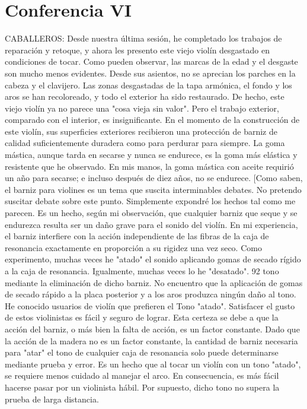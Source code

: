 \chapter*{Conferencia VI}
CABALLEROS: Desde nuestra última sesión, he completado los trabajos de reparación y retoque, y ahora les presento este viejo violín desgastado en condiciones de tocar. Como pueden observar, las marcas de la edad y el desgaste son mucho menos evidentes. Desde sus asientos, no se aprecian los parches en la cabeza y el clavijero. Las zonas desgastadas de la tapa armónica, el fondo y los aros se han recoloreado, y todo el exterior ha sido restaurado. De hecho, este viejo violín ya no parece una "cosa vieja sin valor". Pero el trabajo exterior, comparado con el interior, es insignificante. En el momento de la construcción de este violín, sus superficies exteriores recibieron una protección de barniz de calidad suficientemente duradera como para perdurar para siempre. La goma mástica, aunque tarda en secarse y nunca se endurece, es la goma más elástica y resistente que he observado. En mis manos, la goma mástica con aceite requirió un año para secarse; e incluso después de diez años, no se endurece. [Como saben, el barniz para violines es un tema que suscita interminables debates. No pretendo suscitar debate sobre este punto. Simplemente expondré los hechos tal como me parecen. Es un hecho, según mi observación, que cualquier barniz que seque y se endurezca resulta ser un daño grave para el sonido del violín. En mi experiencia, el barniz interfiere con la acción independiente de las fibras de la caja de resonancia exactamente en proporción a su rigidez una vez seco. Como experimento, muchas veces he "atado" el sonido aplicando gomas de secado rígido a la caja de resonancia. Igualmente, muchas veces lo he "desatado".
92
\label{cuidado_barniz}
tono mediante la eliminación de dicho barniz. No encuentro que la aplicación de gomas de secado rápido a la placa posterior y a los aros produzca ningún daño al tono. He conocido usuarios de violín que prefieren el
Tono "atado". Satisfacer el gusto de estos violinistas es fácil y seguro de lograr. Esta certeza se debe a que la acción del barniz, o más bien la falta de acción, es un factor constante. Dado que la acción de la madera no es un factor constante, la cantidad de barniz necesaria para "atar" el tono de cualquier caja de resonancia solo puede determinarse mediante prueba y error. Es un hecho que al tocar un violín con un tono "atado", se requiere menos cuidado al manejar el arco. En consecuencia, es más fácil hacerse pasar por un violinista hábil. Por supuesto, dicho tono no supera la prueba de larga distancia.
